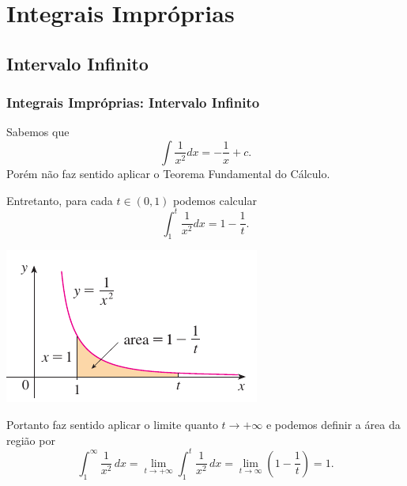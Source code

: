 \section*{Integrais Impróprias}


\subsection*{Intervalo Infinito}
\begin{frame}
\frametitle{ Integrais Impróprias: Intervalo Infinito}
% 

\uncover<1->{Vimos que a integral definida de uma função {\color{blue}positiva} representa a área abaixo de seu gráfico. Analisando o gráfico da função $\dps\frac{1}{x^2}$ quando $x\in[1,+\infty)$ somos levados a pensar que a região sob o gráfico tem {\color{red}área ``infinita''}. }
\bigskip

Sabemos que 
 \[\int\frac{1}{x^2}dx=-\frac{1}{x}+c. \]
 Porém não faz sentido aplicar o Teorema Fundamental do Cálculo.
 \bigskip
 
 
% 
\end{frame}

\begin{frame}[label=improprias]
Entretanto, para cada $t\in(0,1)$ podemos calcular 
 \[\int_1^t\frac{1}{x^2}dx=1-\frac{1}{t}.\]   
 \begin{center}
 \includegraphics[scale=.7]{impropria1.png}
 \end{center}
Portanto faz sentido aplicar o limite quanto $t\to +\infty$ e podemos definir a {\color{red} área da região} por
\[\int_1^\infty \frac{1}{x^2}\, dx=\lim\limits_{t\to+\infty} \int_1^t\frac{1}{x^2}\, dx=\lim\limits_{t\to \infty} \left(1-\frac{1}{t}\right)=1.\]
\end{frame}



